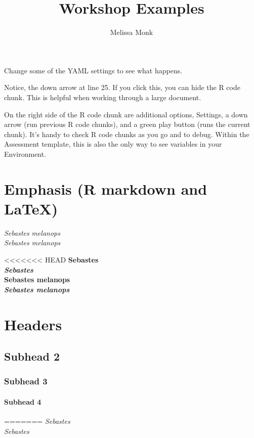 \documentclass[12pt,]{article}
\title{Workshop Examples}
\author{Melissa Monk}
\date{}
\begin{document}
\maketitle


{
\hypersetup{linkcolor=black}
\setcounter{tocdepth}{4}
\tableofcontents
}
Change some of the YAML settings to see what happens.

Notice, the down arrow at line 25. If you click this, you can hide the R
code chunk. This is helpful when working through a large document.

On the right side of the R code chunk are additional options, Settings,
a down arrow (run previous R code chunks), and a green play button (runs
the current chunk). It's handy to check R code chunks as you go and to
debug. Within the Assessment template, this is also the only way to see
variables in your Environment.

\section{Emphasis (R markdown and
LaTeX)}\label{emphasis-r-markdown-and-latex}

\emph{Sebastes} \emph{melanops}\\\emph{Sebastes melanops}

<<<<<<< HEAD
\textbf{Sebastes}\\\textbf{\emph{Sebastes}}\\\textbf{Sebastes melanops}\\\emph{\textbf{Sebastes melanops}}

\section*{Headers}\label{headers}

\subsection{Subhead 2}\label{subhead-2}

\subsubsection*{Subhead 3}\label{subhead-3}

\paragraph{Subhead 4}\label{subhead-4}
=======
\emph{Sebastes}\\
\emph{Sebastes}
\end{document}
